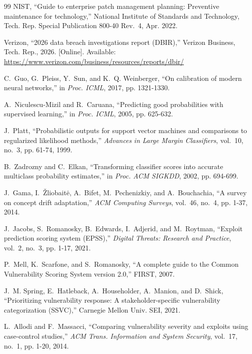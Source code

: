 \documentclass[journal]{IEEEtran}
\begin{document}
\begin{thebibliography}{99}
{NIST}, ``Guide to enterprise patch management planning: Preventive maintenance
  for technology,'' National Institute of Standards and Technology, Tech. Rep.
  Special Publication 800-40 Rev.~4, Apr. 2022.

\BIBentryALTinterwordspacing
{Verizon}, ``2026 data breach investigations report ({DBIR}),'' Verizon
  Business, Tech. Rep., 2026. [Online]. Available:
  \url{https://www.verizon.com/business/resources/reports/dbir/}
\BIBentrySTDinterwordspacing

 C.~Guo, G.~Pleiss, Y.~Sun, and K.~Q. Weinberger, ``On calibration of modern neural networks,'' in \emph{Proc. ICML}, 2017, pp. 1321-1330.

 A.~Niculescu-Mizil and R.~Caruana, ``Predicting good probabilities with supervised learning,'' in \emph{Proc. ICML}, 2005, pp. 625-632.

 J.~Platt, ``Probabilistic outputs for support vector machines and comparisons to regularized likelihood methods,'' \emph{Advances in Large Margin Classifiers}, vol.~10, no.~3, pp. 61-74, 1999.

 B.~Zadrozny and C.~Elkan, ``Transforming classifier scores into accurate multiclass probability estimates,'' in \emph{Proc. ACM SIGKDD}, 2002, pp. 694-699.

 J.~Gama, I.~\v{Z}liobait\.{e}, A.~Bifet, M.~Pechenizkiy, and A.~Bouchachia, ``A survey on concept drift adaptation,'' \emph{ACM Computing Surveys}, vol.~46, no.~4, pp. 1-37, 2014.

 J.~Jacobs, S.~Romanosky, B.~Edwards, I.~Adjerid, and M.~Roytman, ``Exploit prediction scoring system (EPSS),'' \emph{Digital Threats: Research and Practice}, vol.~2, no.~3, pp. 1-17, 2021.

 P.~Mell, K.~Scarfone, and S.~Romanosky, ``A complete guide to the Common Vulnerability Scoring System version 2.0,'' FIRST, 2007.

 J.~M. Spring, E.~Hatleback, A.~Householder, A.~Manion, and D.~Shick, ``Prioritizing vulnerability response: A stakeholder-specific vulnerability categorization (SSVC),'' Carnegie Mellon Univ. SEI, 2021.

 L.~Allodi and F.~Massacci, ``Comparing vulnerability severity and exploits using case-control studies,'' \emph{ACM Trans. Information and System Security}, vol.~17, no.~1, pp. 1-20, 2014.


\end{thebibliography}
\end{document}
